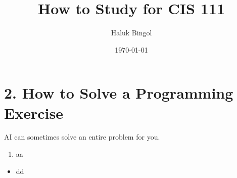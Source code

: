 \documentclass[12pt]{amsart}
\title{How to Study for CIS 111}
\author{Haluk Bingol}
\date{\today} %
\begin{document}
\maketitle
\tableofcontents




\section{2.	How to Solve a Programming Exercise}

AI can sometimes solve an entire problem for you. 

\begin{enumerate}
	
	\item 
	aa
\end{enumerate}



\begin{itemize}
	
	\item 
	dd
\end{itemize}
\end{document}
